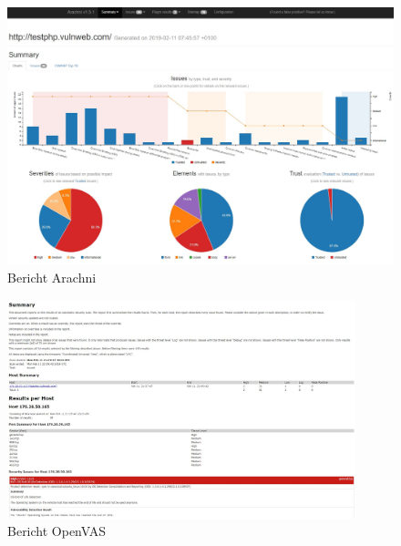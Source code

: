\documentclass[12pt,oneside,a4paper,parskip,pointlessnumbers]{scrbook}
\begin{document}
  \begin{figure}[htb!]
    \centering
      \includegraphics[width=1\textwidth]{Images/ScrArachni}
    \caption[Bericht Arachni]{Bericht Arachni}
  \end{figure}
  \begin{figure}[htb!]
    \centering
      \includegraphics[width=0.9\textwidth]{Images/ScrOpenVAS}
    \caption[Bericht OpenVAS]{Bericht OpenVAS}
  \end{figure}
\end{document}
